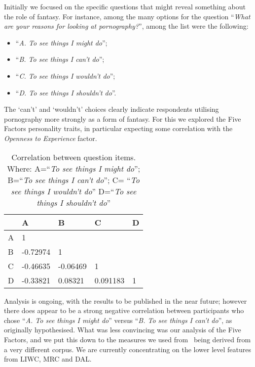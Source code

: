 \documentclass[letterpaper]{article}
\begin{document}
Initially we focused on the specific questions that might reveal
something about the role of fantasy. For instance, among the many
options for the question ``{\emph{What are your reasons for looking at
pornography?}}'', among the list were the following:

\begin{itemize}
\item ``{\emph{A. To see things I might do}}'';
\item ``{\emph{B. To see things I can't do}}'';
\item ``{\emph{C. To see things I wouldn't do}}'';
\item ``{\emph{D. To see things I shouldn't do}}''. 
\end{itemize}

The `can't' and `wouldn't' choices clearly indicate respondents
utilising pornography more strongly as a form of fantasy. For this we
explored the Five Factors personality traits, in particular expecting
some correlation with the {\emph{Openness to Experience}} factor.

\begin{table}[!htb]
\centering
\begin{tabularx}{\columnwidth}{l Y Y Y Y}
\hline
& A & B & C & D\\ 
\hline
A & 1 &  & & \\
B & -0.72974 & 1 & & \\
C & -0.46635 & -0.06469 & 1 & \\
D & -0.33821 & 0.08321 & 0.091183 & 1\\
\hline
\end{tabularx}
\caption{Correlation between question items. Where: A=``{\emph{To
see things I might do}}''; B=``{\emph{To see things I can't do}}''; C=
``{\emph{To see things I wouldn't do}}'' D=``{\emph{To see
things I shouldn't do}}''}
\label{tbl:abcd}
\end{table}

Analysis is ongoing, with the results to be published in the near
future; however there does appear to be a strong negative correlation
between participants who chose ``{\emph{A. To see things I might
do}}'' versus ``{\emph{B. To see things I can't do}}'', as originally
hypothesised. What was less convincing was our analysis of the Five
Factors, and we put this down to the measures we used
from~\cite{mairesse-et-al:2007} being derived from a very different
corpus. We are currently concentrating on the lower level features
from LIWC, MRC and DAL.
\end{document}

